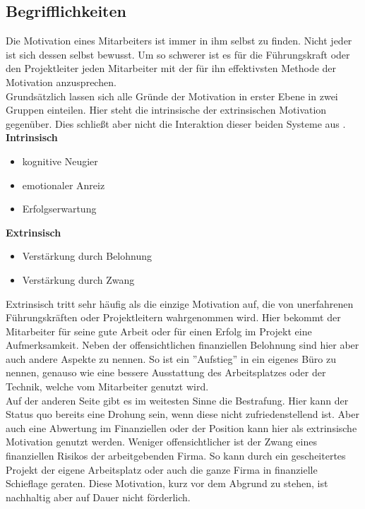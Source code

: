 \documentclass[12pt,a4paper]{scrreprt}
\begin{document}
\subsection{Begrifflichkeiten}
Die Motivation eines Mitarbeiters ist immer in ihm selbst zu finden. Nicht jeder ist sich dessen selbst bewusst. Um so schwerer ist es für die Führungskraft oder den Projektleiter jeden Mitarbeiter mit der für ihn effektivsten Methode der Motivation anzusprechen.\\[0,3cm]
Grundsätzlich lassen sich alle Gründe der Motivation in erster Ebene in zwei Gruppen einteilen. Hier steht die intrinsische der extrinsischen Motivation gegenüber. Dies schließt aber nicht die Interaktion dieser beiden Systeme aus \cite{Heckhausen2006}.  \\[2,5cm]
\textbf{Intrinsisch}
	\begin{itemize}
		\item kognitive Neugier 
		\item emotionaler Anreiz
		\item Erfolgserwartung
	\end{itemize}
\textbf{Extrinsisch}
	\begin{itemize}
		\item Verstärkung durch Belohnung 
		\item Verstärkung durch Zwang
	\end{itemize}	
Extrinsisch tritt sehr häufig als die einzige Motivation auf, die von unerfahrenen Führungskräften oder Projektleitern wahrgenommen wird. Hier bekommt der Mitarbeiter für seine gute Arbeit oder für einen Erfolg im Projekt eine Aufmerksamkeit. Neben der offensichtlichen finanziellen Belohnung sind hier aber auch andere Aspekte zu nennen. So ist ein ''Aufstieg'' in ein eigenes Büro zu nennen, genauso wie eine bessere Ausstattung des Arbeitsplatzes oder der Technik, welche vom Mitarbeiter genutzt wird.\\
Auf der anderen Seite gibt es im weitesten Sinne die Bestrafung. Hier kann der Status quo bereits eine Drohung sein, wenn diese nicht zufriedenstellend ist. Aber auch eine Abwertung im Finanziellen oder der Position kann hier als extrinsische Motivation genutzt werden. Weniger offensichtlicher ist der Zwang eines finanziellen Risikos der arbeitgebenden Firma. So kann durch ein gescheitertes Projekt der eigene Arbeitsplatz oder auch die ganze Firma in finanzielle Schieflage geraten. Diese Motivation, kurz vor dem Abgrund zu stehen, ist nachhaltig aber auf Dauer nicht förderlich.\\[0,3cm]
\end{document}
